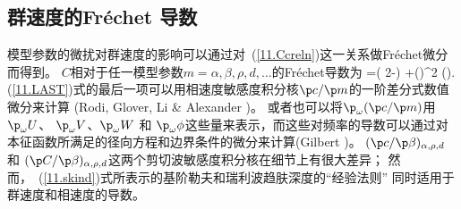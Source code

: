 \subsection{群速度的Fr\'{e}chet 导数}
%
%

模型参数的微扰对群速度的影响可以通过对~(\ref{11.Ccreln})这一关系做Fr\'{e}chet微分而得到。
$C$相对于任一模型参数$m=\alpha,\beta,\rho,d,\ldots$的Fr\'{e}chet导数为
\eq \label{11.LAST}
=\left(
2-\right)
+\om\left(\right)^2\frac{\p}{\p\om}
\hspace{-0.5 mm}\left(\right).
\en
(\ref{11.LAST})式的最后一项可以用相速度敏感度积分核$\p c/\p m$的一阶差分式数值微分来计算
(Rodi, Glover, Li \&
Alexander \citeyear{rodi&al75})。
或者也可以将$\p_{\omega}(\p c/\p m)$用$\p_{\omega}U$、
$\p_{\omega}V$、$\p_{\omega}W$ 和
$\p_{\omega}\phi$这些量来表示，而这些对频率的导数可以通过对本征函数所满足的径向方程和边界条件的微分来计算(Gilbert \citeyear{gilbert76b})。
$(\p c/\p\beta)_{\alpha,\rho,d}$ 和
$(\p C/\p\beta)_{\alpha,\rho,d}$这两个剪切波敏感度积分核在细节上有很大差异；
然而，~(\ref{11.skind})式所表示的基阶勒夫和瑞利波趋肤深度的“经验法则”
%
同时适用于群速度和相速度的导数。
%
%
%
%

